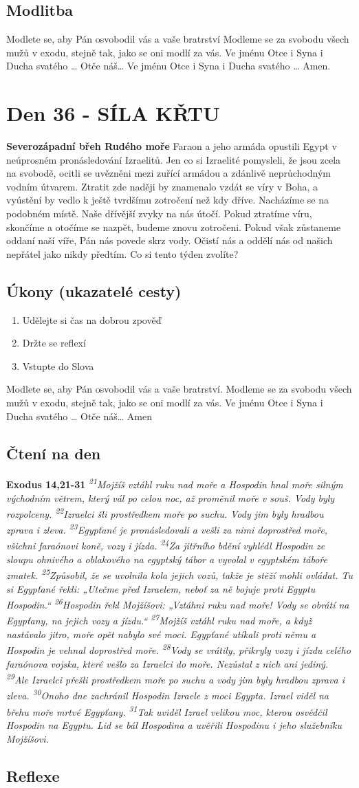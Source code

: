 \documentclass[11pt]{article}
\newcommand{\zacatekSestyTyden}{
  \textbf{Severozápadní břeh Rudého moře} \newline 
  Faraon a jeho armáda opustili Egypt v neúprosném pronásledování Izraelitů. Jen co si Izraelité pomysleli, že jsou zcela na svobodě, ocitli se uvězněni mezi zuřící armádou a zdánlivě neprůchodným vodním útvarem. Ztratit zde naději by znamenalo vzdát se víry v Boha, a vyústění by vedlo k ještě tvrdšímu zotročení než kdy dříve. Nacházíme se na podobném místě. Naše dřívější zvyky na nás útočí. Pokud ztratíme víru, skončíme a otočíme se nazpět, budeme znovu zotročeni. Pokud však zůstaneme oddaní naší víře, Pán nás povede skrz vody. Očistí nás a oddělí nás od našich nepřátel jako nikdy předtím. Co si tento týden zvolíte?

\subsection*{Úkony (ukazatelé cesty)}
\begin{enumerate}
  \item Udělejte si čas na dobrou zpověď
  \item Držte se reflexí
  \item Vstupte do Slova
\end{enumerate}
Modlete se, aby Pán osvobodil vás a vaše bratrství. \newline
Modleme se za svobodu všech mužů v exodu, stejně tak, jako se oni modlí za vás.\newline
Ve jménu Otce i Syna i Ducha svatého …  Otče náš… Amen
}
\begin{document}
\subsection*{Modlitba}
Modlete se, aby Pán osvobodil vás a vaše bratrství \newline
Modleme se za svobodu všech mužů v exodu, stejně tak, jako se oni modlí za vás.\newline
Ve jménu Otce i Syna i Ducha svatého … Otče náš… Ve jménu Otce i Syna i Ducha svatého … Amen.
\newpage
\newpage
\section{Den 36 - SÍLA KŘTU }
\zacatekSestyTyden
\subsection*{Čtení na den}
\textbf{Exodus 14,21-31}
\newline
\textit{
\textsuperscript{21}Mojžíš vztáhl ruku nad moře a Hospodin hnal moře silným východním větrem, který vál po celou noc, až proměnil moře v souš. Vody byly rozpolceny.
\textsuperscript{22}Izraelci šli prostředkem moře po suchu. Vody jim byly hradbou zprava i zleva.
\textsuperscript{23}Egypťané je pronásledovali a vešli za nimi doprostřed moře, všichni faraónovi koně, vozy i jízda.
\textsuperscript{24}Za jitřního bdění vyhlédl Hospodin ze sloupu ohnivého a oblakového na egyptský tábor a vyvolal v egyptském táboře zmatek.
\textsuperscript{25}Způsobil, že se uvolnila kola jejich vozů, takže je stěží mohli ovládat. Tu si Egypťané řekli: „Utečme před Izraelem, neboť za ně bojuje proti Egyptu Hospodin.“
\textsuperscript{26}Hospodin řekl Mojžíšovi: „Vztáhni ruku nad moře! Vody se obrátí na Egypťany, na jejich vozy a jízdu.“
\textsuperscript{27}Mojžíš vztáhl ruku nad moře, a když nastávalo jitro, moře opět nabylo své moci. Egypťané utíkali proti němu a Hospodin je vehnal doprostřed moře.
\textsuperscript{28}Vody se vrátily, přikryly vozy i jízdu celého faraónova vojska, které vešlo za Izraelci do moře. Nezůstal z nich ani jediný.
\textsuperscript{29}Ale Izraelci přešli prostředkem moře po suchu a vody jim byly hradbou zprava i zleva.
\textsuperscript{30}Onoho dne zachránil Hospodin Izraele z moci Egypta. Izrael viděl na břehu moře mrtvé Egypťany.
\textsuperscript{31}Tak uviděl Izrael velikou moc, kterou osvědčil Hospodin na Egyptu. Lid se bál Hospodina a uvěřili Hospodinu i jeho služebníku Mojžíšovi.
}

\subsection*{Reflexe}
\end{document}

